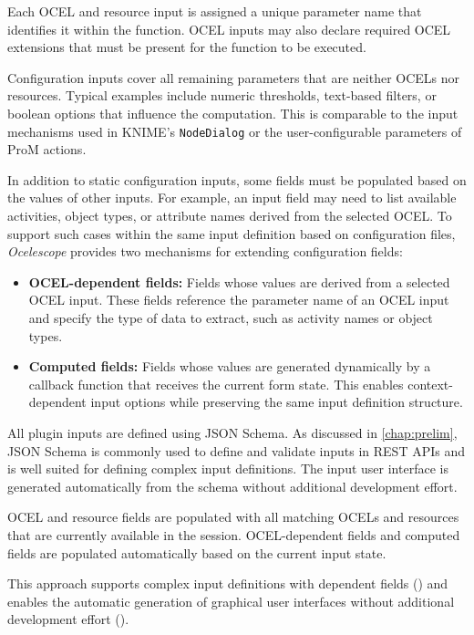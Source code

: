 Each OCEL and resource input is assigned a unique parameter name that identifies it within the function. OCEL inputs may also declare required OCEL extensions that must be present for the function to be executed.

Configuration inputs cover all remaining parameters that are neither OCELs nor resources. Typical examples include numeric thresholds, text-based filters, or boolean options that influence the computation. This is comparable to the input mechanisms used in KNIME’s \texttt{NodeDialog} or the user-configurable parameters of ProM actions.

In addition to static configuration inputs, some fields must be populated based on the values of other inputs. For example, an input field may need to list available activities, object types, or attribute names derived from the selected OCEL. To support such cases within the same input definition based on configuration files, \textit{Ocelescope} provides two mechanisms for extending configuration fields:

\begin{itemize}
	\item \textbf{OCEL-dependent fields:} Fields whose values are derived from a selected OCEL input. These fields reference the parameter name of an OCEL input and specify the type of data to extract, such as activity names or object types.
	\item \textbf{Computed fields:} Fields whose values are generated dynamically by a callback function that receives the current form state. This enables context-dependent input options while preserving the same input definition structure.
\end{itemize}

All plugin inputs are defined using JSON Schema. As discussed in \cref{chap:prelim}, JSON Schema is commonly used to define and validate inputs in REST APIs and is well suited for defining complex input definitions. The input user interface is generated automatically from the schema without additional development effort.

OCEL and resource fields are populated with all matching OCELs and resources that are currently available in the session. OCEL-dependent fields and computed fields are populated automatically based on the current input state.

This approach supports complex input definitions with dependent fields () and enables the automatic generation of graphical user interfaces without additional development effort ().

